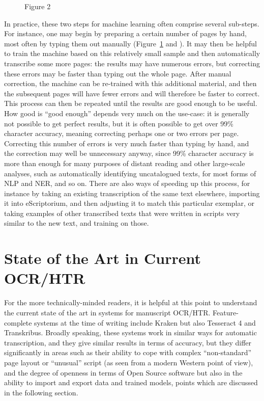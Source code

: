 \begin{figure}[h]
	\caption{Figure 2}
	\label{fig:fig2}
\end{figure}

In practice, these two steps for machine learning often comprise several
sub-steps. For instance, one may begin by preparing a certain number of pages
by hand, most often by typing them out manually (Figure~\ref{fig:fig2} and
\cite[n. 4]{stokes2020videos}). It may then be helpful to train the machine
based on this relatively small sample and then automatically transcribe some
more pages: the results may have numerous errors, but correcting these errors
may be faster than typing out the whole page. After manual correction, the
machine can be re-trained with this additional material, and then the
subsequent pages will have fewer errors and will therefore be faster to
correct. This process can then be repeated until the results are good enough to
be useful. How good is “good enough” depends very much on the use-case: it is
generally not possible to get perfect results, but it is often possible to get
over 99\% character accuracy, meaning correcting perhaps one or two errors per
page. Correcting this number of errors is very much faster than typing by hand,
and the correction may well be unnecessary anyway, since 99\% character
accuracy is more than enough for many purposes of distant reading and other
large-scale analyses, such as automatically identifying uncatalogued texts, for
most forms of NLP and NER, and so on. There are also ways of speeding up this
process, for instance by taking an existing transcription of the same text
elsewhere, importing it into eScriptorium, and then adjusting it to match this
particular exemplar, or taking examples of other transcribed texts that were
written in scripts very similar to the new text, and training on those.

\section{State of the Art in Current OCR/HTR}

For the more technically-minded readers, it is helpful at this point to
understand the current state of the art in systems for manuscript OCR/HTR.
Feature-complete systems at the time of writing include Kraken but also
Tesseract 4 and Transkribus. Broadly speaking, these systems work in similar
ways for automatic transcription, and they give similar results in terms of
accuracy, but they differ significantly in areas such as their ability to cope
with complex “non-standard” page layout or “unusual” script (as seen from a
modern Western point of view), and the degree of openness in terms of Open
Source software but also in the ability to import and export data and trained
models, points which are discussed in the following section.

